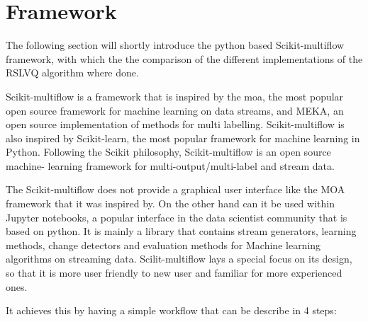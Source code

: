 \documentclass[12pt,oneside,a4paper,parskip]{scrbook}
\begin{document}
\section{Framework}

The following section will shortly introduce the python based Scikit-multiflow framework, with which the the comparison 
of the different implementations of the RSLVQ algorithm where done.

Scikit-multiflow is a framework that is inspired by the \ac{moa}, the most popular open source framework for machine learning on data streams,
and MEKA, an open source implementation of methods for multi labelling. Scikit-multiflow is also inspired by Scikit-learn, the most 
popular framework for machine learning in Python. Following the Scikit philosophy, Scikit-multiflow is an open source machine-
learning framework for multi-output/multi-label and stream data. 

The Scikit-multiflow does not provide a graphical user interface like the MOA framework that it was inspired by. 
On the other hand can it be used within Jupyter notebooks, a popular interface in the data scientist community that is based 
on python. 
It is mainly a library that contains stream generators, learning methods, change detectors and evaluation methods for 
Machine learning algorithms on streaming data. 
Scilit-multiflow lays a special focus on its design, so that it is more user friendly to new user and familiar for more 
experienced ones.\cite{skmultiflow}

It achieves this by having a simple workflow that can be describe in 4 steps:
\end{document}
